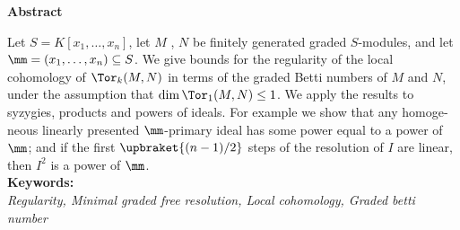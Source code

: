 \thispagestyle{empty} %
\begin{latin} %
\begin{center}
{{\textbf{\large{Abstract}}}}
\end{center}

\vskip 1cm

Let $S = K[x_1,\ldots, x_n]$, let $M$ , $N$ be ﬁnitely generated graded $S$-modules, and let $\mm =(x_1,\ldots, x_n)\subseteq S$. We give bounds for the regularity of the local cohomology of $\Tor_k (M, N)$ in terms
of the graded Betti numbers of $M$ and $N$, under the assumption that $\dim\Tor_1 (M, N)\leq 1$. We apply
the results to syzygies, products and powers of ideals. For example we show that any homogeneous linearly presented
$\mm$-primary ideal has some power equal to a power of $\mm$; and if the ﬁrst $\upbraket{(n-1)/2}$ steps of the
resolution of $I$ are linear, then $I^2$ is a power of $\mm$.
\\
\textbf{Keywords:} \\
\textit{Regularity, Minimal graded  free resolution, Local cohomology, Graded betti number}

\end{latin}

